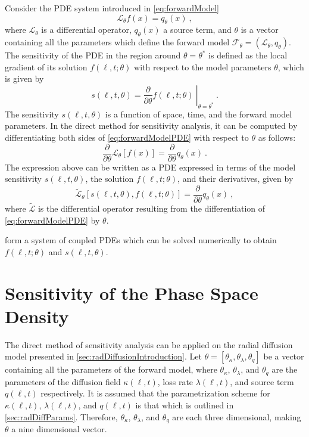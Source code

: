 Consider the PDE system introduced in \cref{eq:forwardModel} 
\begin{equation}\label{eq:forwardModelPDE}
    \mathcal{L}_{\theta} f(x)  = q_{\theta}(x) \ ,
\end{equation}
where $\mathcal{L}_{\theta}$ is a differential operator, $q_{\theta}(x)$ a source term, and 
$\theta$ is a vector containing all the parameters which define the forward model 
$\mathcal{F}_{\theta} = (\mathcal{L}_{\theta}, q_{\theta})$. The sensitivity of the PDE in the 
region around $\theta = \theta^{\ast}$ is defined as the local gradient of its solution 
$f(\ell, t; \theta)$ with respect to the model parameters $\theta$, which is given by 
\[
    s(\ell, t, \theta) =  
    \left. \frac{\partial}{\partial \theta}f(\ell, t; \theta) \ 
    \right\rvert_{\theta = \theta^{\ast}} \ .
\] 
%
The sensitivity $s(\ell, t, \theta)$ is a function of space, time, and the forward model 
parameters. In the direct method for sensitivity analysis, it can be computed by differentiating 
both sides of \cref{eq:forwardModelPDE} with respect to $\theta$ as follows:  
\[
    \frac{\partial}{\partial{\theta}} \mathcal{L}_{\theta}[f(x)] = 
        \frac{\partial}{\partial{\theta}} q_{\theta}(x) \ .
\] 
The expression above can be written as a PDE expressed in terms of the model sensitivity 
$s(\ell, t, \theta)$, the solution $f(\ell, t; \theta)$, and their derivatives, given by 
\begin{equation}\label{eq:forwardModelSens}
   \tilde{\mathcal{L}}_{\theta}[s(\ell, t, \theta), f(\ell, t; \theta)] = 
    \frac{\partial}{\partial{\theta}} q_{\theta}(x) \ ,
\end{equation}
%
where $\tilde{\mathcal{L}}$ is the differential operator resulting from the differentiation of 
\cref{eq:forwardModelPDE} by $\theta$.

 form a system of coupled PDEs which can be 
solved numerically to obtain $f(\ell, t; \theta)$ and $s(\ell, t, \theta)$.

\section*{Sensitivity of the Phase Space Density}

The direct method of sensitivity analysis can be applied on the radial diffusion model presented 
in \cref{sec:radDiffusionIntroduction}. Let 
$\theta = [\theta_{\kappa}, \theta_{\lambda}, \theta_{q}]$ be a vector containing all the 
parameters of the forward model, where $\theta_{\kappa}$, $\theta_{\lambda}$, and $\theta_{q}$ are 
the parameters of the diffusion field $\kappa(\ell, t)$, loss rate $\lambda(\ell, t)$, and 
source term $q(\ell, t)$ respectively. It is assumed that the parametrization scheme for 
$\kappa(\ell, t)$, $\lambda(\ell, t)$, and $q(\ell, t)$ is that which is outlined in 
\cref{sec:radDiffParams}. Therefore, $\theta_{\kappa}$, $\theta_{\lambda}$, and $\theta_{q}$ are 
each three dimensional, making $\theta$ a nine dimensional vector.

